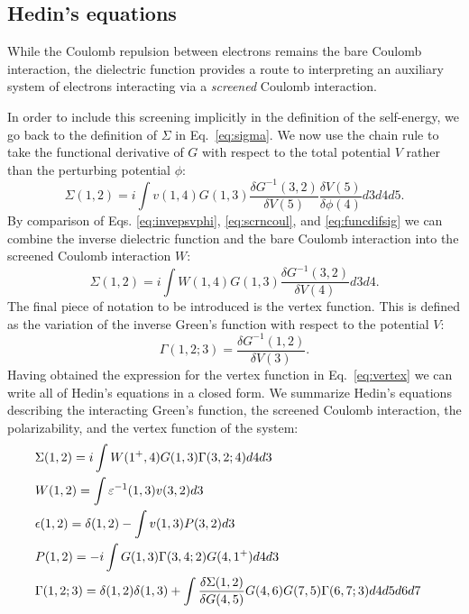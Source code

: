 \subsection{Hedin's equations}
\noindent
\label{sec:hedineqs}
While the Coulomb repulsion between electrons remains the bare Coulomb interaction, 
the dielectric function provides a route to interpreting 
an auxiliary system of electrons interacting via a \emph{screened} Coulomb interaction.

In order to include this screening implicitly in the definition of the self-energy, we 
go back to the definition of $\Sigma$ in Eq.~\ref{eq:sigma}. We now use the chain 
rule to take the functional derivative of $G$ with 
respect to the total potential $V$ rather than the perturbing potential $\phi$:
%
\begin{equation}
\label{eq:funcdifsig}
\Sigma(1,2) =  i\int v(1,4) G(1,3)\frac{\delta G^{-1}(3,2)}{\delta V(5)}\frac{\delta V(5)}{\delta\phi(4)}d3d4d5.
\end{equation}
%
By comparison of Eqs. \ref{eq:invepsvphi}, \ref{eq:scrncoul}, and \ref{eq:funcdifsig} we can combine
the inverse dielectric function and the bare Coulomb interaction into the screened Coulomb interaction $W$:
%
\begin{equation}
\Sigma(1,2) =  i\int W(1,4)G(1,3)\frac{\delta G^{-1}(3,2)}{\delta V(4)}d3d4.
\end{equation}
%
The final piece of notation to be introduced is the vertex function. This is defined as the variation 
of the inverse Green's function with respect to the potential $V$:
%
\begin{equation}
\label{eq:vertex}
\Gamma(1,2;3) = \frac{\delta G^{-1}(1,2)}{\delta V(3)}.
\end{equation}
%
Having obtained the expression for the vertex function in Eq.~\ref{eq:vertex} we
can write all of Hedin's equations in a closed form.
We summarize Hedin's equations describing the interacting Green's function,
the screened Coulomb interaction, the polarizability, and the vertex function of the system:
%
\begin{align}
\label{eq:hedinsig}
&\Sigma(1,2)   = i\int W(1^{+},4)G(1,3)\Gamma(3,2;4)d4d3 &   \\
\label{eq:hedinw}
&W(1,2)        =  \int \varepsilon^{-1}(1,3)v(3,2) d3 &               \\
\label{eq:hedineps}
&\epsilon(1,2) =  \delta(1,2) - \int v(1,3)P(3,2)d3 &        \\
\label{eq:hedinpol}
&P(1,2)        = -i\int G(1,3)\Gamma(3,4;2) G(4,1^{+})d4d3 & \\
\label{eq:hedinvert}
&\Gamma(1,2;3) = \delta(1,2)\delta(1,3) + \int \frac{\delta\Sigma(1,2)}{\delta G(4,5)}G(4,6)G(7,5) \Gamma(6,7;3)d4d5d6d7 & 
\end{align}


